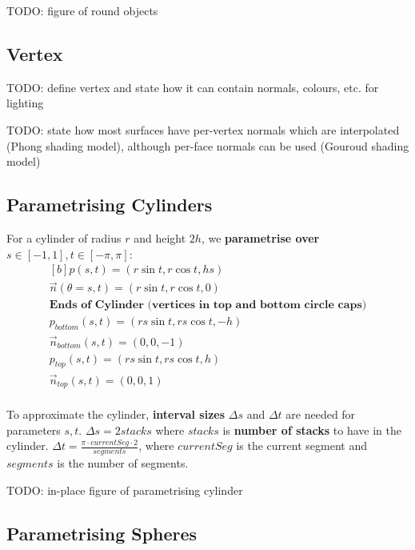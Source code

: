 \documentclass{article}
\begin{document}
TODO: figure of round objects

\subsection{Vertex}

TODO: define vertex and state how it can contain normals, colours, etc. for lighting

TODO: state how most surfaces have per-vertex normals which are interpolated  (Phong shading model), although per-face normals can be used (Gouroud shading model)

\subsection{Parametrising Cylinders}

For a cylinder of radius $r$ and height $2h$, we \textbf{parametrise over} $s \in [-1, 1], t \in [-\pi, \pi]$:
\begin{equation}
	\begin{aligned}[b]
	p(s, t) = (r \sin t, r \cos t, hs) \\
	\vec{n}(\theta = s,t) = (r \sin t, r \cos t, 0)
	\\
	\textbf{Ends of Cylinder (vertices in top and bottom circle caps)} \\
	p_{bottom}(s, t) = (rs \sin t, rs \cos t, -h) \\
	\vec{n}_{bottom}(s, t) = (0, 0, -1) \\
	p_{top}(s, t) = (rs \sin t, rs \cos t, h) \\
	\vec{n}_{top}(s, t) = (0, 0, 1) \\
	\end{aligned}
	\label{eq:cylinder-parametrisation}
\end{equation}

To approximate the cylinder, \textbf{interval sizes} $\Delta s$ and $\Delta t$ are needed for parameters $s,t$. $\Delta s = 2stacks$ where $stacks$ is \textbf{number of stacks} to have in the cylinder. $\Delta t = \frac{\pi \cdot currentSeg \cdot 2}{segments}$, where $currentSeg$ is the current segment and $segments$ is the number of segments.

TODO: in-place figure of parametrising cylinder 

\subsection{Parametrising Spheres}
\end{document}
